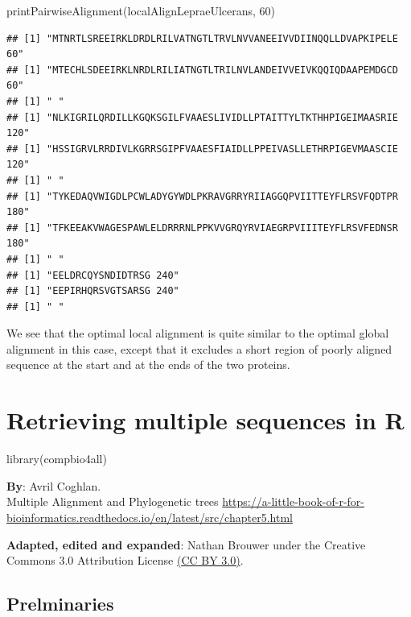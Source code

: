 \documentclass[
]{book}
\newenvironment{Shaded}{\begin{snugshade}}{\end{snugshade}}
\newcommand{\DecValTok}[1]{\textcolor[rgb]{0.00,0.00,0.81}{#1}}
\newcommand{\FunctionTok}[1]{\textcolor[rgb]{0.00,0.00,0.00}{#1}}
\newcommand{\NormalTok}[1]{#1}
\begin{document}
\begin{Shaded}
\begin{Highlighting}[]
\FunctionTok{printPairwiseAlignment}\NormalTok{(localAlignLepraeUlcerans, }\DecValTok{60}\NormalTok{)}
\end{Highlighting}
\end{Shaded}

\begin{verbatim}
## [1] "MTNRTLSREEIRKLDRDLRILVATNGTLTRVLNVVANEEIVVDIINQQLLDVAPKIPELE 60"
## [1] "MTECHLSDEEIRKLNRDLRILIATNGTLTRILNVLANDEIVVEIVKQQIQDAAPEMDGCD 60"
## [1] " "
## [1] "NLKIGRILQRDILLKGQKSGILFVAAESLIVIDLLPTAITTYLTKTHHPIGEIMAASRIE 120"
## [1] "HSSIGRVLRRDIVLKGRRSGIPFVAAESFIAIDLLPPEIVASLLETHRPIGEVMAASCIE 120"
## [1] " "
## [1] "TYKEDAQVWIGDLPCWLADYGYWDLPKRAVGRRYRIIAGGQPVIITTEYFLRSVFQDTPR 180"
## [1] "TFKEEAKVWAGESPAWLELDRRRNLPPKVVGRQYRVIAEGRPVIIITEYFLRSVFEDNSR 180"
## [1] " "
## [1] "EELDRCQYSNDIDTRSG 240"
## [1] "EEPIRHQRSVGTSARSG 240"
## [1] " "
\end{verbatim}

We see that the optimal local alignment is quite similar to the optimal global alignment in this case, except that it excludes a short region of poorly aligned sequence at the start and at the ends of the two proteins.

\hypertarget{retrieving-multiple-sequences-in-r}{%
\chapter{Retrieving multiple sequences in R}\label{retrieving-multiple-sequences-in-r}}

\begin{Shaded}
\begin{Highlighting}[]
\FunctionTok{library}\NormalTok{(compbio4all)}
\end{Highlighting}
\end{Shaded}

\textbf{By}: Avril Coghlan.\\
Multiple Alignment and Phylogenetic trees
\url{https://a-little-book-of-r-for-bioinformatics.readthedocs.io/en/latest/src/chapter5.html}

\textbf{Adapted, edited and expanded}: Nathan Brouwer under the Creative Commons 3.0 Attribution License \href{https://creativecommons.org/licenses/by/3.0/}{(CC BY 3.0)}.

\hypertarget{prelminaries}{%
\section{Prelminaries}\label{prelminaries}}
\end{document}
